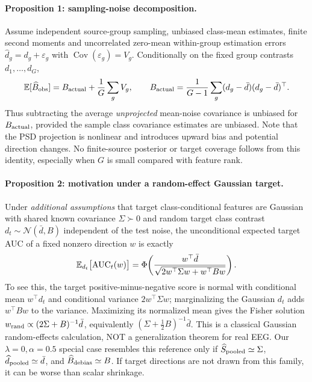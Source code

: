 \paragraph{Proposition 1: sampling-noise decomposition.}
Assume independent source-group sampling, unbiased class-mean
estimates, finite second moments and uncorrelated zero-mean
within-group estimation errors
$\widehat d_g=d_g+\varepsilon_g$ with
$\operatorname{Cov}(\varepsilon_g)=V_g$.
Conditionally on the fixed group contrasts $d_1,\ldots,d_G$,
\[
  \mathbb E[\widehat B_{\rm obs}]
  = B_{\rm actual} + {1\over G}\sum_g V_g,
  \qquad
  B_{\rm actual}={1\over G-1}\sum_g(d_g-\bar d)
                                   (d_g-\bar d)^\top .
\]
Thus subtracting the average \emph{unprojected} mean-noise covariance
is unbiased for $B_{\rm actual}$, provided the sample class
covariance estimates are unbiased. Note that the PSD projection is
nonlinear and introduces upward bias and potential direction changes.
No finite-source posterior or target coverage follows from this
identity, especially when $G$ is small compared with feature rank.

\paragraph{Proposition 2: motivation under a random-effect Gaussian target.}
Under \emph{additional assumptions} that target class-conditional
features are Gaussian with shared known covariance $\Sigma\succ0$
and random target class contrast $d_t\sim
\mathcal N(\bar d,B)$ independent of the test noise,
the unconditional expected target AUC of a fixed nonzero direction $w$
is exactly
\[
 \mathbb E_{d_t}\bigl[\operatorname{AUC}_t(w)\bigr]
  =\Phi\!\left(
     {w^\top\bar d\over\sqrt{2w^\top\Sigma w+w^\top Bw}}\right).
\]
To see this, the target positive-minus-negative score is normal
with conditional mean $w^\top d_t$ and conditional variance
$2w^\top\Sigma w$; marginalizing the Gaussian $d_t$ adds
$w^\top Bw$ to the variance. Maximizing its normalized mean
gives the Fisher solution
$w_{\rm rand}\propto(2\Sigma+B)^{-1}\bar d$,
equivalently
$(\Sigma+\tfrac12 B)^{-1}\bar d$.
This is a classical Gaussian random-effects calculation, NOT a
generalization theorem for real EEG. Our $\lambda=0,\alpha=0.5$
special case resembles this reference only if
$\widehat S_{\rm pooled}\simeq\Sigma$,
$\widehat d_{\rm pooled}\simeq\bar d$, and
$\widehat B_{\rm debias}\simeq B$.
If target directions are not drawn from this family, it can be worse
than scalar shrinkage.


